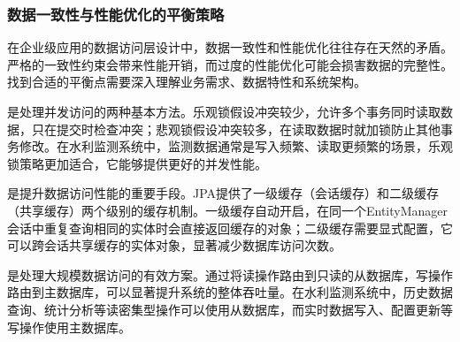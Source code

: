 \hypertarget{ux6570ux636eux4e00ux81f4ux6027ux4e0eux6027ux80fdux4f18ux5316ux7684ux5e73ux8861ux7b56ux7565}{%
\subsubsection{数据一致性与性能优化的平衡策略}\label{ux6570ux636eux4e00ux81f4ux6027ux4e0eux6027ux80fdux4f18ux5316ux7684ux5e73ux8861ux7b56ux7565}}

在企业级应用的数据访问层设计中，数据一致性和性能优化往往存在天然的矛盾。严格的一致性约束会带来性能开销，而过度的性能优化可能会损害数据的完整性。找到合适的平衡点需要深入理解业务需求、数据特性和系统架构。

是处理并发访问的两种基本方法。乐观锁假设冲突较少，允许多个事务同时读取数据，只在提交时检查冲突；悲观锁假设冲突较多，在读取数据时就加锁防止其他事务修改。在水利监测系统中，监测数据通常是写入频繁、读取更频繁的场景，乐观锁策略更加适合，它能够提供更好的并发性能。

是提升数据访问性能的重要手段。JPA提供了一级缓存（会话缓存）和二级缓存（共享缓存）两个级别的缓存机制。一级缓存自动开启，在同一个EntityManager会话中重复查询相同的实体时会直接返回缓存的对象；二级缓存需要显式配置，它可以跨会话共享缓存的实体对象，显著减少数据库访问次数。

是处理大规模数据访问的有效方案。通过将读操作路由到只读的从数据库，写操作路由到主数据库，可以显著提升系统的整体吞吐量。在水利监测系统中，历史数据查询、统计分析等读密集型操作可以使用从数据库，而实时数据写入、配置更新等写操作使用主数据库。

